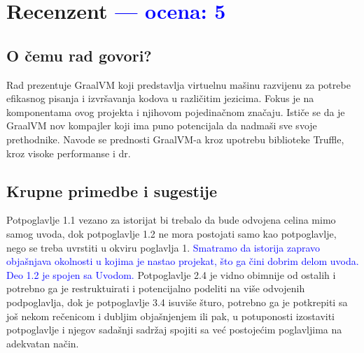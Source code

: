 \documentclass[a4paper]{report}
\newcommand{\odgovor}[1]{\textcolor{blue}{#1}}
\begin{document}
\chapter{Recenzent \odgovor{--- ocena: 5} }
	
	
	\section{O čemu rad govori?}
	Rad prezentuje GraalVM koji predstavlja virtuelnu mašinu razvijenu za potrebe efikasnog pisanja i izvršavanja kodova u različitim jezicima. Fokus je na komponentama ovog projekta i njihovom pojedinačnom značaju. Ističe se da je GraalVM nov kompajler koji ima puno potencijala da nadmaši sve svoje prethodnike. Navode se prednosti GraalVM-a kroz upotrebu biblioteke Truffle, kroz visoke performanse i dr. 
	
	\section{Krupne primedbe i sugestije}
	Potpoglavlje 1.1 vezano za istorijat bi trebalo da bude odvojena celina mimo samog uvoda, dok potpoglavlje 1.2 ne mora postojati samo kao potpoglavlje, nego se treba uvrstiti u okviru poglavlja 1. 
	\odgovor{Smatramo da istorija zapravo objašnjava okolnosti u kojima je nastao projekat, što ga čini dobrim delom uvoda. Deo 1.2 je spojen sa Uvodom.}
	Potpoglavlje 2.4 je vidno obimnije od ostalih i potrebno ga je restruktuirati i potencijalno podeliti na više odvojenih podpoglavlja, dok je potpoglavlje 3.4 isuviše šturo, potrebno ga je potkrepiti sa još nekom rečenicom i dubljim objašnjenjem ili pak, u potuponosti izostaviti potpoglavlje i njegov sadašnji sadržaj spojiti sa već postojećim poglavljima na adekvatan način.
	
\end{document}
